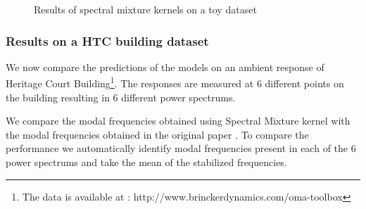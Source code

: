 \begin{figure}[!ht]
  \centering
  \quad
    \quad
  
  \caption{Results of spectral mixture kernels on a toy dataset}
\end{figure}

\subsubsection{Results on a HTC building dataset}
We now compare the predictions of the models on an ambient response of Heritage Court Building\footnote{The data is available at : http://www.brinckerdynamics.com/oma-toolbox}. The responses are measured at 6 different points on the building resulting in 6 different power spectrums. 

We compare the modal frequencies obtained using Spectral Mixture kernel with the modal frequencies obtained in the original paper \cite{brincker2000modal}. To compare the performance we automatically identify modal frequencies present in each of the 6 power spectrums and take the mean of the stabilized frequencies.

